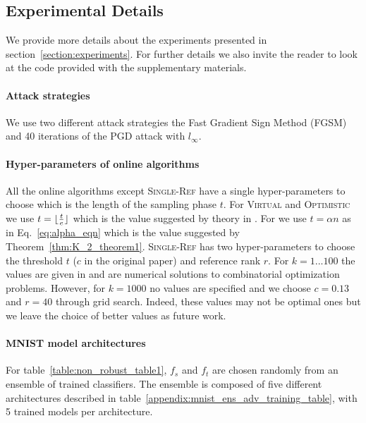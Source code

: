 \subsection{Experimental Details}
\label{appendix:additional_results_larger_datasets}
We provide more details about the experiments presented in section~\ref{section:experiments}. For further details we also invite the reader to look at the code provided with the supplementary materials.

\paragraph{Attack strategies} We use two different attack strategies the Fast Gradient Sign Method (FGSM) \citep{goodfellow2014explaining} and 40 iterations of the PGD attack \citep{madry2017towards} with $l_\infty$.

\paragraph{Hyper-parameters of online algorithms} All the online algorithms except \textsc{Single-Ref} have a single hyper-parameters to choose which is the length of the sampling phase $t$. For \textsc{Virtual} and \textsc{Optimistic} we use $t=\lfloor  \frac{t}{e} \rfloor$ which is the value suggested by theory in \citet{babaioff2007knapsack}. For \textsc{\algoname} we use $t=\alpha n$ as in Eq.~\ref{eq:alpha_eqn} which is the value suggested by Theorem~\ref{thm:K_2_theorem1}. \textsc{Single-Ref} has two hyper-parameters to choose the threshold $t$ ($c$ in the original paper) and reference rank $r$. For $k=1...100$ the values are given in \citet{albers2020new} and are numerical solutions to combinatorial optimization problems. However, for $k = 1000$ no values are specified and we choose $c=0.13$ and $r=40$ through grid search. Indeed, these values may not be optimal ones but we leave the choice of better values as future work.

\paragraph{MNIST model architectures} For table~\ref{table:non_robust_table1}, $f_s$ and $f_t$ are chosen randomly from an ensemble of trained classifiers. The ensemble is composed of five different architectures described in table~\ref{appendix:mnist_ens_adv_training_table}, with 5 trained models per architecture.

